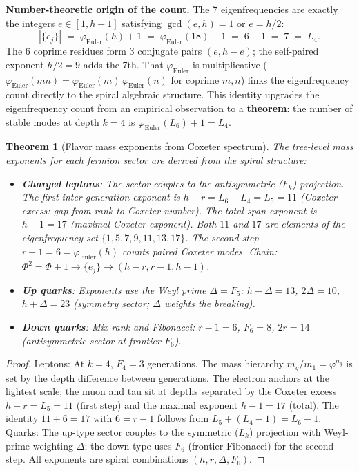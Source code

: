 \documentclass[12pt,a4paper]{article}
\newtheorem{theorem}{Theorem}[section]
\begin{document}
\textbf{Number-theoretic origin of the count.} The 7 eigenfrequencies are exactly the integers $e \in [1, h{-}1]$ satisfying $\gcd(e, h) = 1$ or $e = h/2$:
\begin{equation}
|\{e_j\}| \;=\; \varphi_{\mathrm{Euler}}(h) + 1 \;=\; \varphi_{\mathrm{Euler}}(18) + 1 \;=\; 6 + 1 \;=\; 7 \;=\; L_4.
\end{equation}
The 6 coprime residues form 3 conjugate pairs $(e, h{-}e)$; the self-paired exponent $h/2 = 9$ adds the 7th. That $\varphi_{\mathrm{Euler}}$ is multiplicative ($\varphi_{\mathrm{Euler}}(mn) = \varphi_{\mathrm{Euler}}(m)\,\varphi_{\mathrm{Euler}}(n)$ for coprime $m,n$) links the eigenfrequency count directly to the spiral algebraic structure. This identity upgrades the eigenfrequency count from an empirical observation to a \textbf{theorem}: the number of stable modes at depth $k = 4$ is $\varphi_{\mathrm{Euler}}(L_6) + 1 = L_4$.

\begin{theorem}[Flavor mass exponents from Coxeter spectrum]
\label{thm:flavor-exponents}
The tree-level mass exponents for each fermion sector are \emph{derived} from the spiral structure:
\begin{itemize}[nosep]
\item \textbf{Charged leptons}: The sector couples to the antisymmetric ($F_k$) projection. The first inter-generation exponent is $h - r = L_6 - L_4 = L_5 = 11$ (Coxeter excess: gap from rank to Coxeter number). The total span exponent is $h - 1 = 17$ (maximal Coxeter exponent). Both $11$ and $17$ are elements of the eigenfrequency set $\{1, 5, 7, 9, 11, 13, 17\}$. The second step $r - 1 = 6 = \varphi_{\mathrm{Euler}}(h)$ counts paired Coxeter modes. Chain: $\Phi^2{=}\Phi{+}1 \to \{e_j\} \to (h{-}r, r{-}1, h{-}1)$.
\item \textbf{Up quarks}: Exponents use the Weyl prime $\Delta = F_5$: $h - \Delta = 13$, $2\Delta = 10$, $h + \Delta = 23$ (symmetry sector; $\Delta$ weights the breaking).
\item \textbf{Down quarks}: Mix rank and Fibonacci: $r - 1 = 6$, $F_6 = 8$, $2r = 14$ (antisymmetric sector at frontier $F_6$).
\end{itemize}
\end{theorem}

\begin{proof}
Leptons: At $k = 4$, $F_4 = 3$ generations. The mass hierarchy $m_g/m_1 = \varphi^{n_g}$ is set by the depth difference between generations. The electron anchors at the lightest scale; the muon and tau sit at depths separated by the Coxeter excess $h - r = L_5 = 11$ (first step) and the maximal exponent $h - 1 = 17$ (total). The identity $11 + 6 = 17$ with $6 = r - 1$ follows from $L_5 + (L_4 - 1) = L_6 - 1$. Quarks: The up-type sector couples to the symmetric ($L_k$) projection with Weyl-prime weighting $\Delta$; the down-type uses $F_6$ (frontier Fibonacci) for the second step. All exponents are spiral combinations $(h, r, \Delta, F_6)$.
\end{proof}
\end{document}
